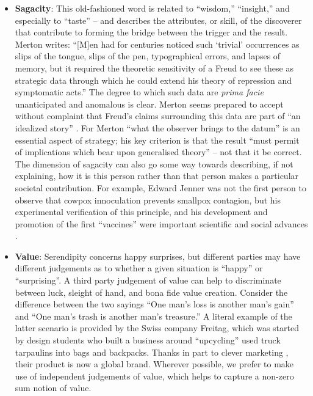 \begin{itemize}
\item \textbf{Sagacity}: This old-fashioned word is related to
  ``wisdom,'' ``insight,'' and especially to ``taste'' -- and
  describes the attributes, or skill, of the discoverer that
  contribute to forming the bridge between the trigger and the result.
  Merton \citeyearpar[p.~507]{merton1948bearing} writes: ``{[}M{]}en
  had for centuries noticed such `trivial' occurrences as slips of the
  tongue, slips of the pen, typographical errors, and lapses of
  memory, but it required the theoretic sensitivity of a Freud to see
  these as strategic data through which he could extend his theory of
  repression and symptomatic acts.''  The degree to which such data
  are \emph{prima facie} unanticipated and anomalous is clear.  Merton
  seems prepared to accept without complaint that Freud's claims
  surrounding this data are part of ``an idealized story''
  \cite{freudtheory}.  For Merton ``what the observer brings to the
  datum'' is an essential aspect of strategy; his key criterion is
  that the result ``must permit of implications which bear upon
  generalised theory'' -- not that it be correct.  The dimension of
  sagacity can also go some way towards describing, if not explaining,
  how it is this person rather than that person makes a particular
  societal contribution.  For example, Edward Jenner was not the first
  person to observe that cowpox innoculation prevents smallpox
  contagion, but his experimental verification of this principle, and
  his development and promotion of the first ``vaccines'' were
  important scientific and social advances \cite{riedel2005edward}.
\end{itemize}


\begin{itemize}
\item \textbf{Value}: Serendipity concerns happy surprises, but
  different parties may have different judgements as to whether a
  given situation is ``happy'' or ``surprising''.  A third party
  judgement of value can help to discriminate between luck, sleight of
  hand, and bona fide value creation.  Consider the difference between
  the two sayings ``One man's loss is another man's gain'' and ``One
  man's trash is another man's treasure.''  A literal example of the
  latter scenario is provided by the Swiss company Freitag, which was
  started by design students who built a business around ``upcycling''
  used truck tarpaulins into bags and backpacks.  Thanks in part to
  clever marketing \cite[pp. 54--55, 68--69]{russo2010companies},
  their product is now a global brand.  Wherever possible, we prefer
  to make use of independent judgements of value, which helps to
  capture a non-zero sum notion of value.
\end{itemize}

